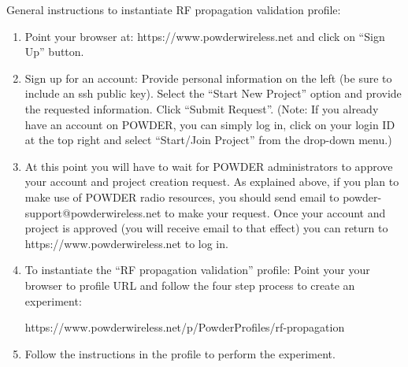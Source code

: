 \documentclass[10pt]{article}
\begin{document}
General instructions to instantiate RF propagation validation profile:
\begin{enumerate}
\item Point your browser at: https://www.powderwireless.net and click on ``Sign Up'' button.
\item Sign up for an account: Provide personal information on the left (be sure to include
an ssh public key). Select the ``Start New Project'' option and provide the requested
information. Click ``Submit Request''. (Note: If you  already
have an account on POWDER, you can simply log in, click on your login ID at the
top right and select ``Start/Join Project'' from the drop-down menu.)
\item At this point you will have to wait for POWDER administrators to approve your account
and project creation request. As explained above, if you plan to make use of POWDER radio resources,
you should send email to powder-support@powderwireless.net to make your request. 
Once your account and project is approved (you will
receive email to that effect) you can return to
https://www.powderwireless.net to log in.
\item To instantiate the ``RF propagation validation'' profile: Point your your browser to
profile URL and follow the four step process to create an experiment: 
%

https://www.powderwireless.net/p/PowderProfiles/rf-propagation
\item Follow the instructions in the profile to perform the experiment.
\end{enumerate}


%
%
\end{document}
